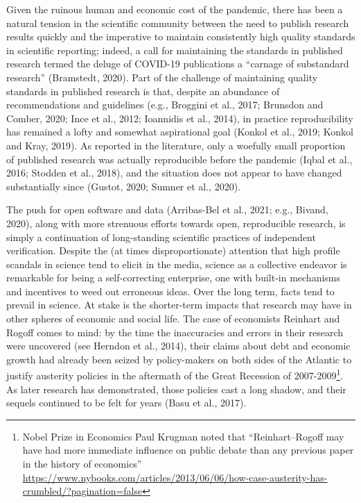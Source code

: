 \documentclass[]{elsarticle} %
\begin{document}
Given the ruinous human and economic cost of the pandemic, there has
been a natural tension in the scientific community between the need to
publish research results quickly and the imperative to maintain
consistently high quality standards in scientific reporting; indeed, a
call for maintaining the standards in published research termed the
deluge of COVID-19 publications a ``carnage of substandard research''
(Bramstedt, 2020). Part of the challenge of maintaining quality
standards in published research is that, despite an abundance of
recommendations and guidelines (e.g., Broggini et al., 2017; Brunsdon
and Comber, 2020; Ince et al., 2012; Ioannidis et al., 2014), in
practice reproducibility has remained a lofty and somewhat aspirational
goal (Konkol et al., 2019; Konkol and Kray, 2019). As reported in the
literature, only a woefully small proportion of published research was
actually reproducible before the pandemic (Iqbal et al., 2016; Stodden
et al., 2018), and the situation does not appear to have changed
substantially since (Gustot, 2020; Sumner et al., 2020).

The push for open software and data (Arribas-Bel et al., 2021; e.g.,
Bivand, 2020), along with more strenuous efforts towards open,
reproducible research, is simply a continuation of long-standing
scientific practices of independent verification. Despite the (at times
disproportionate) attention that high profile scandals in science tend
to elicit in the media, science as a collective endeavor is remarkable
for being a self-correcting enterprise, one with built-in mechanisms and
incentives to weed out erroneous ideas. Over the long term, facts tend
to prevail in science. At stake is the shorter-term impacts that
research may have in other spheres of economic and social life. The case
of economists Reinhart and Rogoff comes to mind: by the time the
inaccuracies and errors in their research were uncovered (see Herndon et
al., 2014), their claims about debt and economic growth had already been
seized by policy-makers on both sides of the Atlantic to justify
austerity policies in the aftermath of the Great Recession of
2007-2009\footnote{Nobel Prize in Economics Paul Krugman noted that
  ``Reinhart--Rogoff may have had more immediate influence on public
  debate than any previous paper in the history of economics''
  \url{https://www.nybooks.com/articles/2013/06/06/how-case-austerity-has-crumbled/?pagination=false}}.
As later research has demonstrated, those policies cast a long shadow,
and their sequels continued to be felt for years (Basu et al., 2017).
\end{document}
